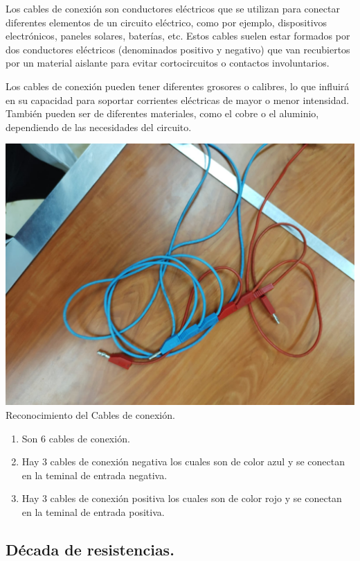 \documentclass[10pt]{article}
\begin{document}
\begin{multicols}{2}
Los cables de conexión son conductores eléctricos que se utilizan para conectar diferentes elementos de un circuito eléctrico, como por ejemplo, dispositivos electrónicos, paneles solares, baterías, etc. Estos cables suelen estar formados por dos conductores eléctricos (denominados positivo y negativo) que van recubiertos por un material aislante para evitar cortocircuitos o contactos involuntarios.

Los cables de conexión pueden tener diferentes grosores o calibres, lo que influirá en su capacidad para soportar corrientes eléctricas de mayor o menor intensidad. También pueden ser de diferentes materiales, como el cobre o el aluminio, dependiendo de las necesidades del circuito.

\begin{center}
\includegraphics[scale=0.1]{Cables}\\
Reconocimiento del Cables de conexión.
\begin{enumerate}
\item Son 6 cables de conexión.
\item Hay 3 cables de conexión negativa los cuales son de color azul y se conectan en la teminal de entrada negativa.
\item Hay 3 cables de conexión positiva los cuales son de color rojo y se conectan en la teminal de entrada positiva.
\end{enumerate}
\end{center}

\subsection{Década de resistencias.}


\end{multicols}
\end{document}
